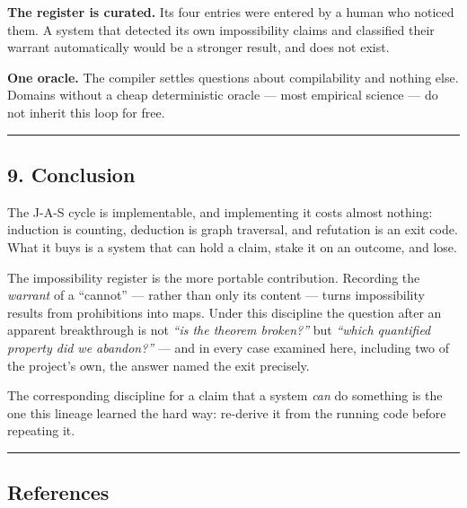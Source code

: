 \documentclass[
  11pt,
  a4paper,
]{article}
\begin{document}
\textbf{The register is curated.} Its four entries were entered by a
human who noticed them. A system that detected its own impossibility
claims and classified their warrant automatically would be a stronger
result, and does not exist.

\textbf{One oracle.} The compiler settles questions about compilability
and nothing else. Domains without a cheap deterministic oracle --- most
empirical science --- do not inherit this loop for free.

\begin{center}\rule{0.5\linewidth}{0.5pt}\end{center}

\subsection{9. Conclusion}\label{conclusion}

The J-A-S cycle is implementable, and implementing it costs almost
nothing: induction is counting, deduction is graph traversal, and
refutation is an exit code. What it buys is a system that can hold a
claim, stake it on an outcome, and lose.

The impossibility register is the more portable contribution. Recording
the \emph{warrant} of a ``cannot'' --- rather than only its content ---
turns impossibility results from prohibitions into maps. Under this
discipline the question after an apparent breakthrough is not \emph{``is
the theorem broken?''} but \emph{``which quantified property did we
abandon?''} --- and in every case examined here, including two of the
project's own, the answer named the exit precisely.

The corresponding discipline for a claim that a system \emph{can} do
something is the one this lineage learned the hard way: re-derive it
from the running code before repeating it.

\begin{center}\rule{0.5\linewidth}{0.5pt}\end{center}

\subsection{References}\label{references}
\end{document}
